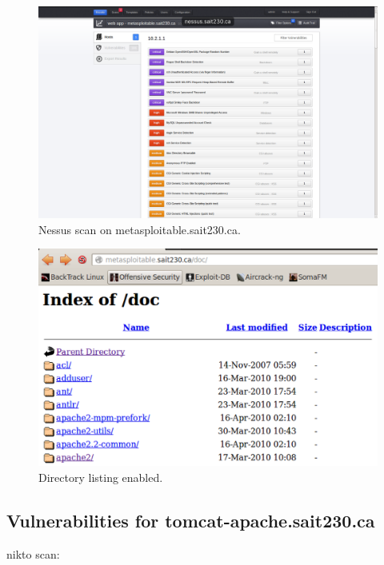 \documentclass{article}
\begin{document}
\begin{figure}[h!]
	\includegraphics[width=\linewidth]{images/nessus-metasploitable.png}
	\caption{Nessus scan on metasploitable.sait230.ca.}
	\label{fig:nessus-metasploitable}
\end{figure}

\begin{figure}[h!]
	\includegraphics[width=\linewidth]{images/screenshot.png}
	\caption{Directory listing enabled.}
	\label{fig:directory-listing}
\end{figure}

\subsection{Vulnerabilities for tomcat-apache.sait230.ca}
nikto scan:
\end{document}
